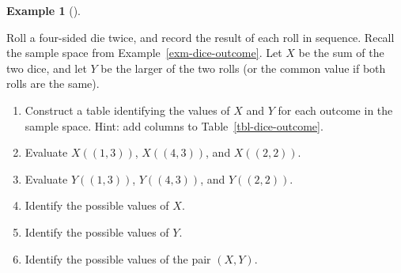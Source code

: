 \documentclass[
  letterpaper,
  DIV=11,
  numbers=noendperiod]{scrreprt}
\providecommand{\tightlist}{%
  \setlength{\itemsep}{0pt}\setlength{\parskip}{0pt}}
\theoremstyle{plain}
\theoremstyle{definition}
\newtheorem{example}{Example}[chapter]
\theoremstyle{definition}
\theoremstyle{definition}
\theoremstyle{remark}
\begin{document}
\begin{tcolorbox}[enhanced jigsaw, opacityback=0, left=2mm, colframe=quarto-callout-note-color-frame, toprule=.15mm, breakable, colback=white, leftrule=.75mm, arc=.35mm, rightrule=.15mm, bottomrule=.15mm]

\begin{example}[]\protect\hypertarget{exm-dice-rv}{}\label{exm-dice-rv}

Roll a four-sided die twice, and record the result of each roll in
sequence. Recall the sample space from Example~\ref{exm-dice-outcome}.
Let \(X\) be the sum of the two dice, and let \(Y\) be the larger of the
two rolls (or the common value if both rolls are the same).

\begin{enumerate}
\def\labelenumi{\arabic{enumi}.}
\tightlist
\item
  Construct a table identifying the values of \(X\) and \(Y\) for each
  outcome in the sample space. Hint: add columns to
  Table~\ref{tbl-dice-outcome}.
\item
  Evaluate \(X((1, 3))\), \(X((4, 3))\), and \(X((2, 2))\).
\item
  Evaluate \(Y((1, 3))\), \(Y((4, 3))\), and \(Y((2, 2))\).
\item
  Identify the possible values of \(X\).
\item
  Identify the possible values of \(Y\).
\item
  Identify the possible values of the pair \((X, Y)\).
\end{enumerate}

\end{example}

\end{tcolorbox}
\end{document}
